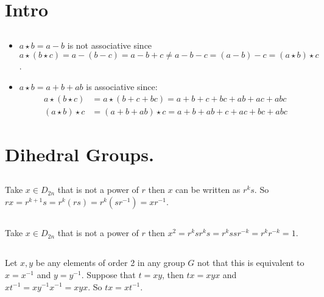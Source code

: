 \documentclass[10pt,a4paper]{book}
\begin{document}
\section{Intro}
\subsection{}
\begin{itemize}
\item $ a \star b = a - b$ is not associative since $a \star (b \star c) = a - (b - c) = a- b + c \neq a - b - c = (a - b) - c = (a \star b) \star c$.
\item $a \star b = a + b + ab$ is associative since:
\begin{align*}
a \star (b \star c) &= a\star( b + c + bc) = a + b + c + bc + ab + ac + abc\\
(a \star b) \star c &= (a + b + ab) \star c = a + b + ab + c + ac + bc + abc
\end{align*}
\end{itemize}

\section{Dihedral Groups.}
\subsection{}
Take $x \in D_{2n}$ that is not a power of $r$ then $x$ can be written as $r^k s$. So $r x = r^{k+1} s = r^k (rs) = r^k (sr^{-1}) = x r^{-1}$.
\subsection{}
Take $x \in D_{2n}$ that is not a power of $r$ then $x^2 = r^k s r^k s = r^k s s r^{-k} = r^k r^{-k} = 1.$
\subsection{}
Let $x, y$ be any elements of order 2 in any group $G$ not that this is equivalent to $x = x^{-1}$ and $y = y^{-1}$. Suppose that $t = xy$, then $tx = xyx$ and $xt^{-1} = xy^{-1}x^{-1} = xyx$. So $tx = xt^{-1}$.
\subsection{}
\end{document}
